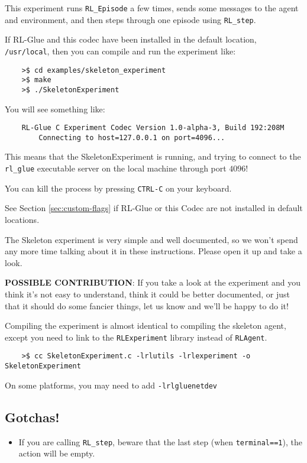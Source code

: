 \documentclass[11pt]{article}
\begin{document}
This experiment runs \texttt{RL\_Episode} a few times, sends some messages to the agent and environment, and then steps through one episode using \texttt{RL\_step}.

If RL-Glue and this codec have been installed in the default location, \texttt{/usr/local}, then you can compile and run the experiment like:
\begin{verbatim}
	>$ cd examples/skeleton_experiment
	>$ make
	>$ ./SkeletonExperiment
\end{verbatim}

You will see something like:
\begin{verbatim}
	RL-Glue C Experiment Codec Version 1.0-alpha-3, Build 192:208M
		Connecting to host=127.0.0.1 on port=4096...
\end{verbatim}

This means that the SkeletonExperiment is running, and trying to connect to the \texttt{rl\_glue} executable server on the local machine through port $4096$!  

You can kill the process by pressing \texttt{CTRL-C} on your keyboard.

See Section \ref{sec:custom-flags} if RL-Glue or this Codec are not installed in default locations.

The Skeleton experiment is very simple and well documented, so we won't spend any more time talking about it in these instructions.
Please open it up and take a look.

\textbf{POSSIBLE CONTRIBUTION}: If you take a look at the experiment and you think it's not easy to understand, think it could be better documented, 
or just that it should do some fancier things, let us know and we'll be happy to do it!

Compiling the experiment is almost identical to compiling the skeleton agent, except you need to link to the \texttt{RLExperiment} library instead of \texttt{RLAgent}.
\begin{verbatim}
	>$ cc SkeletonExperiment.c -lrlutils -lrlexperiment -o SkeletonExperiment
\end{verbatim}

On some platforms, you may need to add \texttt{-lrlgluenetdev}

\subsection{Gotchas!}
\begin{itemize}
	\item If you are calling \texttt{RL\_step}, beware that the last step (when \texttt{terminal==1}), the action will be empty.
\end{itemize}
\end{document}
